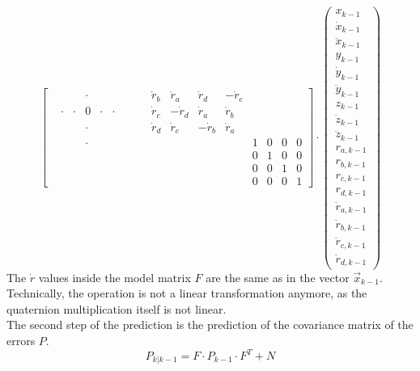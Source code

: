 \begin{equation*}
\begin{bmatrix}
         &  &  & \cdot &  &  &  &  &  & \dot{r}_{b} &  \dot{r}_{a} &  \dot{r}_{d} & -\dot{r}_{c} &  &  &  &  \\
         & \cdot & \cdot & 0 & \cdot & \cdot &  &  &  & \dot{r}_{c} & -\dot{r}_{d} &  \dot{r}_{a} &  \dot{r}_{b} &  &  &  &  \\
         &  &  & \cdot &  &  &  &  &  & \dot{r}_{d} &  \dot{r}_{c} & -\dot{r}_{b} &  \dot{r}_{a} &  &  &  &  \\
         &  &  & \cdot &  &  &  &  &  &  &  &  &  & 1 & 0 & 0 & 0 \\
         &  &  &  &  &  &  &  &  &  &  &  &  & 0 & 1 & 0 & 0 \\
         &  &  &  &  &  &  &  &  &  &  &  &  & 0 & 0 & 1 & 0 \\
         &  &  &  &  &  &  &  &  &  &  &  &  & 0 & 0 & 0 & 1
    \end{bmatrix} 
    \cdot 
    \begin{pmatrix}
        x_{k-1}\\
        \dot{x}_{k-1}\\
        \ddot{x}_{k-1}\\
        y_{k-1}\\
        \dot{y}_{k-1}\\
        \ddot{y}_{k-1}\\
        z_{k-1}\\
        \dot{z}_{k-1}\\
        \ddot{z}_{k-1}\\
        r_{a,k-1}\\
        r_{b,k-1}\\
        r_{c,k-1}\\
        r_{d,k-1}\\
        \dot{r}_{a,k-1}\\
        \dot{r}_{b,k-1}\\
        \dot{r}_{c,k-1}\\
        \dot{r}_{d,k-1}
    \end{pmatrix}
\end{equation*}
The $\dot{r}$ values inside the model matrix $F$ are the same as in the vector $\vec{x}_{k-1}$. Technically, the operation is not a linear transformation anymore, as the quaternion multiplication itself is not linear.\\
The second step of the prediction is the prediction of the covariance matrix of the errors $P$. 
\begin{equation*}
    P_{k|k-1} = 
    F
    \cdot
    P_{k-1}
    \cdot
    F^{T}
    +
    N
\end{equation*}
